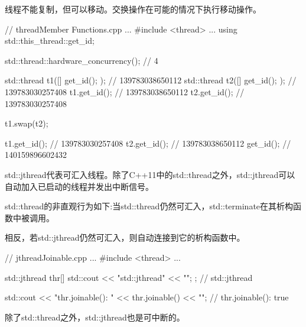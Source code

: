 线程不能复制，但可以移动。交换操作在可能的情况下执行移动操作。


\begin{cpp}
// threadMember Functions.cpp
...
#include <thread>
...
using std::this_thread::get_id;

std::thread::hardware_concurrency(); // 4

std::thread t1([]{ get_id(); }); // 139783038650112
std::thread t2([]{ get_id(); }); // 139783030257408
t1.get_id(); // 139783038650112
t2.get_id(); // 139783030257408

t1.swap(t2);

t1.get_id(); // 139783030257408
t2.get_id(); // 139783038650112
get_id(); // 140159896602432
\end{cpp}


std::jthread代表可汇入线程。除了C++11中的std::thread之外，std::jthread可以自动加入已启动的线程并发出中断信号。


std::thread的非直观行为如下:当std::thread仍然可汇入，std::terminate在其析构函数中被调用。

相反，若std::jthread仍然可汇入，则自动连接到它的析构函数中。


\begin{cpp}
// jthreadJoinable.cpp
...
#include <thread>
...

std::jthread thr{[]{ std::cout << "std::jthread" << "\n"; }}; // std::jthread

std::cout << "thr.joinable(): " << thr.joinable() << "\n"; // thr.joinable(): true
\end{cpp}

除了std::thread之外，std::jthread也是可中断的。














